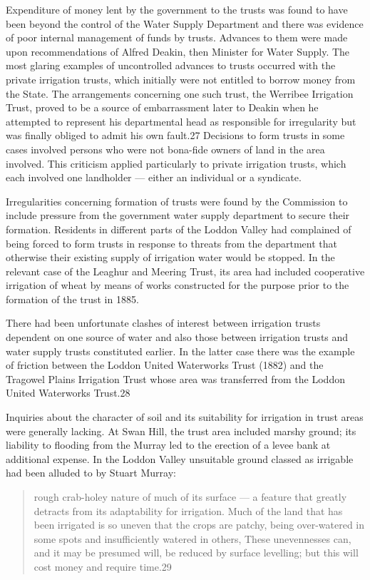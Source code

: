 Expenditure of money lent by the government to the trusts was found to
have been beyond the control of the Water Supply Department and there
was evidence of poor internal management of funds by trusts. Advances
to them were made upon recommendations of Alfred Deakin, then Minister
for Water Supply. The most glaring examples of uncontrolled advances
to trusts occurred with the private irrigation trusts, which initially
were not entitled to borrow money from the State. The arrangements
concerning one such trust, the Werribee Irrigation Trust, proved to be
a source of embarrassment later to Deakin when he attempted to
represent his departmental head as responsible for irregularity but
was finally obliged to admit his own fault.27 Decisions to form trusts
in some cases involved persons who were not bona-fide owners of land
in the area involved. This criticism applied particularly to private
irrigation trusts, which each involved one landholder --- either an
individual or a syndicate.

Irregularities concerning formation of trusts were found by the
Commission to include pressure from the government water supply
department to secure their formation. Residents in different parts of
the Loddon Valley had complained of being forced to form trusts in
response to threats from the department that otherwise their existing
supply of irrigation water would be stopped. In the relevant case of
the Leaghur and Meering Trust, its area had included cooperative
irrigation of wheat by means of works constructed for the purpose
prior to the formation of the trust in 1885.

There had been unfortunate clashes of interest between irrigation
trusts dependent on one source of water and also those between
irrigation trusts and water supply trusts constituted earlier. In the
latter case there was the example of friction between the Loddon
United Waterworks Trust (1882) and the Tragowel Plains Irrigation
Trust whose area was transferred from the Loddon United Waterworks
Trust.28

Inquiries about the character of soil and its suitability for
irrigation in trust areas were generally lacking. At Swan Hill, the
trust area included marshy ground; its liability to flooding from the
Murray led to the erection of a levee bank at additional expense. In
the Loddon Valley unsuitable ground classed as irrigable had been
alluded to by Stuart Murray:
\begin{quote}
	rough crab-holey nature of much of its surface --- a feature
	that greatly detracts from its adaptability for
	irrigation. Much of the land that has been irrigated is so
	uneven that the crops are patchy, being over-watered in some
	spots and insufficiently watered in others, These unevennesses
	can, and it may be presumed will, be reduced by surface
	levelling; but this will cost money and require time.29
\end{quote}

